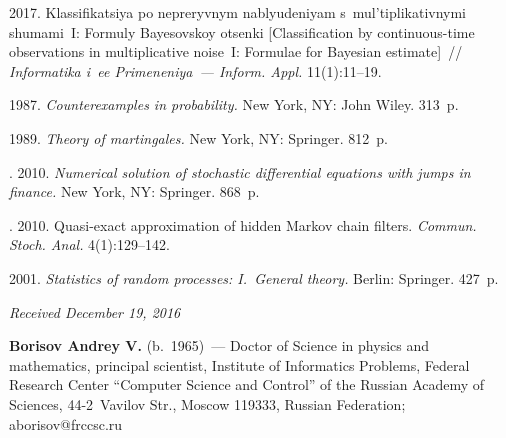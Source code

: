   \begin{multicols}{2}

\renewcommand{\bibname}{\protect\rmfamily References}

{\small\frenchspacing
 {%
 \begin{thebibliography}{9}
 2017. 
Klassifikatsiya po nepreryvnym nablyudeniyam s~mul'tiplikativnymi shumami~I:
Formuly Bayesovskoy otsenki 
[Classification by continuous-time observations in multiplicative noise~I: 
Formulae for Bayesian estimate]~//
\textit{Informatika i~ee Primeneniya~--- Inform. Appl.} 11(1):11--19.

 1987. \textit{Counterexamples in probability.} 
New York, NY: John Wiley. 313~p.

 1989. \textit{Theory of martingales.}
New York, NY: Springer. 812~p.

. 2010.
\textit{Numerical solution of stochastic differential equations with jumps in finance.}
New York, NY: Springer. 868~p.

. 2010.
Quasi-exact approximation of hidden Markov chain filters.
\textit{Commun. Stoch. Anal.} 4(1):129--142.

 2001. 
\textit{Statistics of random processes: I.~General theory.} Berlin: Springer. 427~p.
\end{thebibliography}

 }
 }

\end{multicols}

\vspace*{-3pt}

\hfill{\small\textit{Received December 19, 2016}}

\Contrl

\noindent
\textbf{Borisov Andrey V.} (b.\ 1965)~--- 
Doctor of Science in physics and mathematics, principal scientist, Institute of
Informatics Problems, Federal Research Center ``Computer Science and Control'' 
of the Russian Academy of
Sciences, 44-2~Vavilov Str., Moscow 119333, Russian Federation; \mbox{aborisov@frccsc.ru}

\label{end\stat}


\renewcommand{\bibname}{\protect\rm Литература} 
